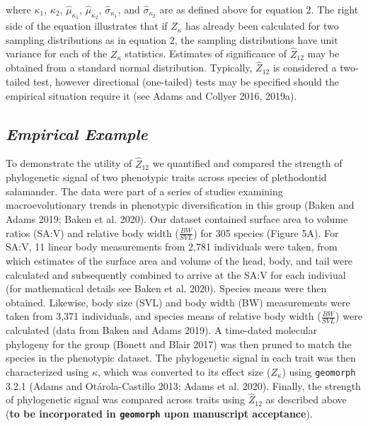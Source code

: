 \documentclass[
]{article}
\begin{document}
{where \(\kappa_1\), \(\kappa_2\), \(\hat\mu_{\kappa_1}\),
\(\hat\mu_{\kappa_2}\), \(\hat\sigma_{\kappa_1}\), and
\(\hat\sigma_{\kappa_2}\) are as defined above for equation 2. The right
side of the equation illustrates that if \(Z_\kappa\) has already been
calculated for two sampling distributions as in equation 2, the sampling
distributions have unit variance for each of the \(Z_\kappa\)
statistics. Estimates of significance of \(\hat{Z}_{12}\) may be
obtained from a standard normal distribution. Typically,
\(\hat{Z}_{12}\) is considered a two-tailed test, however directional
(one-tailed) tests may be specified should the empirical situation
require it (see Adams and Collyer 2016, 2019a). \hfill\break

\hypertarget{empirical-example}{%
\subsection{\texorpdfstring{\emph{Empirical
Example}}{Empirical Example}}\label{empirical-example}}

To demonstrate the utility of \(\hat{Z}_{12}\) we quantified and
compared the strength of phylogenetic signal of two phenotypic traits
across species of plethodontid salamander. The data were part of a
series of studies examining macroevolutionary trends in phenotypic
diversification in this group (Baken and Adams 2019; Baken et al. 2020).
Our dataset contained surface area to volume ratios (SA:V) and relative
body width (\(\frac{BW}{SVL}\)) for 305 species (Figure 5A). For SA:V,
11 linear body measurements from 2,781 individuals were taken, from
which estimates of the surface area and volume of the head, body, and
tail were calculated and subsequently combined to arrive at the SA:V for
each indiviual (for mathematical details see Baken et al. 2020). Species
means were then obtained. Likewise, body size (SVL) and body width (BW)
measurements were taken from 3,371 individuals, and species means of
relative body width (\(\frac{BW}{SVL}\)) were calculated (data from
Baken and Adams 2019). A time-dated molecular phylogeny for the group
(Bonett and Blair 2017) was then pruned to match the species in the
phenotypic dataset. The phylogenetic signal in each trait was then
characterized using \(\kappa\), which was converted to its effect size
(\(Z_\kappa\)) using \texttt{geomorph} 3.2.1 (Adams and Otárola-Castillo
2013; Adams et al. 2020). Finally, the strength of phylogenetic signal
was compared across traits using \(\hat{Z}_{12}\) as described above
(\textbf{to be incorporated in \texttt{geomorph} upon manuscript
acceptance}). \hfill\break

}
\end{document}
